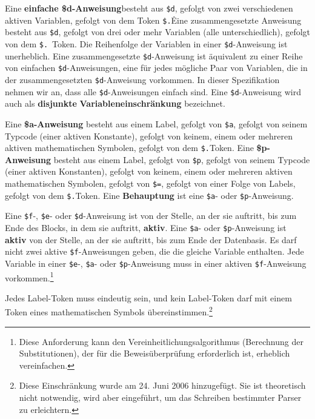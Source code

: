 Eine {\bf einfache \$d-Anweisung}besteht aus \texttt{\$d}, gefolgt von zwei verschiedenen aktiven Variablen, gefolgt von dem Token \texttt{\$.}\.  Eine zusammengesetzte Anweisung besteht aus \texttt{\$d}, gefolgt von drei oder mehr Variablen (alle unterschiedlich), gefolgt von dem \texttt{\$.}\ Token.  Die Reihenfolge der Variablen in einer \texttt{\$d}-Anweisung ist unerheblich.  Eine zusammengesetzte \texttt{\$d}-Anweisung ist äquivalent zu einer Reihe von einfachen \texttt{\$d}-Anweisungen, eine für jedes mögliche Paar von Variablen, die in der zusammengesetzten \texttt{\$d}-Anweisung vorkommen.  In dieser Spezifikation nehmen wir an, dass alle \texttt{\$d}-Anweisungen einfach sind.  Eine \texttt{\$d}-Anweisung wird auch als {\bf disjunkte} {\bf Variableneinschränkung} bezeichnet.

Eine {\bf \$a-Anweisung} besteht aus einem Label, gefolgt von \texttt{\$a}, gefolgt von seinem Typcode (einer aktiven Konstante), gefolgt von keinem, einem oder mehreren aktiven mathematischen Symbolen, gefolgt von dem \texttt{\$.}\-Token.  Eine {\bf \$p-Anweisung} besteht aus einem Label, gefolgt von \texttt{\$p}, gefolgt von seinem Typcode (einer aktiven Konstanten), gefolgt von keinem, einem oder mehreren aktiven mathematischen Symbolen, gefolgt von \texttt{\$=}, gefolgt von einer Folge von Labels, gefolgt von dem \texttt{\$.}\-Token.  Eine {\bf Behauptung} ist eine \texttt{\$a}- oder \texttt{\$p}-Anweisung.

Eine \texttt{\$f}-, \texttt{\$e}- oder \texttt{\$d}-Anweisung ist von der Stelle, an der sie auftritt, bis zum Ende des Blocks, in dem sie auftritt, {\bf aktiv}. Eine \texttt{\$a}- oder \texttt{\$p}-Anweisung ist {\bf aktiv} von der Stelle, an der sie auftritt, bis zum Ende der Datenbasis. Es darf nicht zwei aktive \texttt{\$f}-Anweisungen geben, die die gleiche Variable enthalten.  Jede Variable in einer \texttt{\$e}-, \texttt{\$a}- oder \texttt{\$p}-Anweisung muss in einer aktiven \texttt{\$f}-Anweisung vorkommen.\footnote{Diese Anforderung kann den Vereinheitlichungsalgorithmus (Berechnung der Substitutionen), der für die Beweisüberprüfung erforderlich ist, erheblich vereinfachen.}

Jedes Label-Token muss eindeutig sein, und kein Label-Token darf mit einem Token eines mathematischen Symbols übereinstimmen.\label{namespace}\footnote{Diese Einschränkung wurde am 24. Juni 2006 hinzugefügt. Sie ist theoretisch nicht notwendig, wird aber eingeführt, um das Schreiben bestimmter Parser zu erleichtern.}


